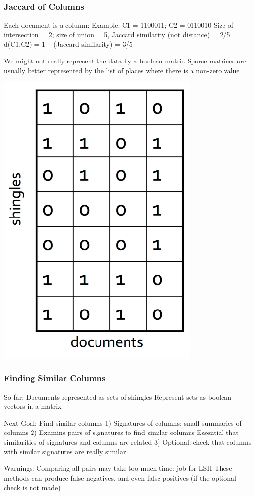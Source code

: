 \documentclass[svgnames]{beamer}
\begin{document}
  
\begin{frame} \frametitle{Jaccard of Columns}

Each document is a column:
  Example: C1 = 1100011; C2 = 0110010
  Size of intersection = 2; size of union = 5, Jaccard similarity (not distance) = 2/5
  d(C1,C2) = 1 – (Jaccard similarity) = 3/5

We might not really represent the data by a boolean matrix
  Sparse matrices are usually better represented by the list of places where there is a non-zero value
  
\includegraphics[width=10cm]{matrix}

\end{frame}

  
\begin{frame} \frametitle{Finding Similar Columns}
So far:
  Documents represented as sets of shingles
  Represent sets as boolean vectors in a matrix

Next Goal: Find similar columns
 1) Signatures of columns: small summaries of columns
 2) Examine pairs of signatures to find similar columns 
       Essential that similarities of signatures and columns are related
 3) Optional: check that columns with similar signatures are really similar

Warnings:
  Comparing all pairs may take too much time: job for LSH
  These methods can produce false negatives, and even false positives (if the optional check is not made)
  \end{frame}
\end{document}
